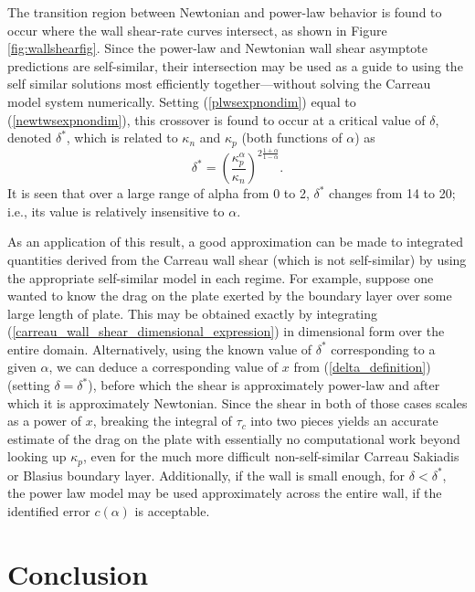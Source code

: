 \documentclass[lineno]{JFM-FLM_Au}
\begin{document}
The transition region between Newtonian and power-law behavior is found to occur where the wall shear-rate curves intersect, as shown in Figure \ref{fig:wallshearfig}. Since the power-law and Newtonian wall shear asymptote predictions are self-similar, their intersection may be used as a guide to using the self similar solutions most efficiently together---without solving the Carreau model system numerically. Setting (\ref{plwsexpnondim}) equal to (\ref{newtwsexpnondim}), this crossover is found to occur at a critical value of $\delta$, denoted $\delta^*$, which is related to $\kappa_n$ and $\kappa_p$ (both functions of $\alpha$) as \begin{equation} \delta^* = \left(\dfrac{\kappa_p^\alpha}{\kappa_n}\right)^{2\frac{1+\alpha}{1-\alpha}}. \label{delta_star_definition} \end{equation} It is seen that over a large range of alpha from 0 to 2, $\delta^*$ changes from 14 to 20; i.e., its value is relatively insensitive to $\alpha$.

	As an application of this result, a good approximation can be made to integrated quantities derived from the Carreau wall shear (which is not self-similar) by using the appropriate self-similar model in each regime. For example, suppose one wanted to know the drag on the plate exerted by the boundary layer over some large length of plate. This may be obtained exactly by integrating (\ref{carreau_wall_shear_dimensional_expression}) in dimensional form over the entire domain. Alternatively, using the known value of $\delta^*$ corresponding to a given $\alpha$, we can deduce a corresponding value of $x$ from (\ref{delta_definition}) (setting $\delta=\delta^*$), before which the shear is approximately power-law and after which it is approximately Newtonian. Since the shear in both of those cases scales as a power of $x$, breaking the integral of $\tau_c$ into two pieces yields an accurate estimate of the drag on the plate with essentially no computational work beyond looking up $\kappa_p$, even for the much more difficult non-self-similar Carreau Sakiadis or Blasius boundary layer. Additionally, if the wall is small enough, for $\delta<\delta^*$, the power law model may be used approximately across the entire wall, if the identified error $c(\alpha)$ is acceptable.

\section{Conclusion}
\end{document}

